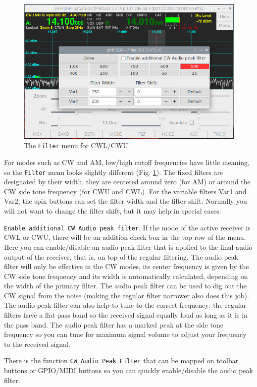 \documentclass[12pt]{book}
\def\rett#1{\texttt{\color{red}#1}}
\def\bltt#1{\texttt{\color{blue}#1}}
\begin{document}
\begin{figure}[ht]
\center
\includegraphics[width=12cm]{FilterMenuCW.png}
\caption{The \bltt{Filter} menu for CWL/CWU.}
\label{fig:FilterMenuCW}
\end{figure}

For modes such as CW and AM, low/high cutoff frequencies have little meaning, so the
\bltt{Filter} menu looks slightly different (Fig. \ref{fig:FilterMenuCW}). The fixed
filters are designated by their width, they are centered around zero (for AM) or around
the CW side tone frequency (for CWU and CWL). For the variable filters Var1 and Var2,
the spin buttons can set the filter width and the filter shift. Normally you will not
want to change the filter shift, but it may help in special cases.

\rett{Enable additional CW Audio peak filter}. If the mode of the
active receiver is CWL or CWU, there will be an addition check box in the
top row of the menu. Here you can enable/disable an audio peak filter that
is applied to the final audio output of the receiver, that is, on top of
the regular filtering. The audio peak filter will only be effective in
the CW modes, its center frequency is given by the CW side tone frequency
and its width is automatically calculated, depending on the
width of the primary filter. The audio peak filter can be used to dig out
the CW signal from the noise (making the regular filter narrower also
does this job). The audio peak filter can also help to tune to the correct
frequency: the regular filters have a flat pass band so the received
signal equally loud as long as it is in the pass band. The audio peak filter
has a marked peak at the side tone frequency so you can tune for maximum
signal volume to adjust your frequency to the received signal.

There is the function \bltt{CW Audio Peak Filter} that can be mapped on toolbar
buttons or GPIO/MIDI buttons so you can quickly enable/disable the audio peak
filter.
\end{document}
